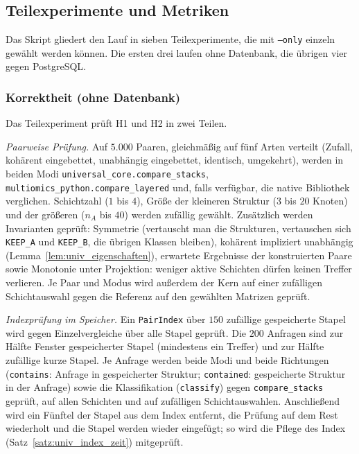 \subsection{Teilexperimente und Metriken}
\label{sec:ucx_teilexperimente}

Das Skript gliedert den Lauf in sieben Teilexperimente, die mit \texttt{--only} einzeln gewählt werden können. Die ersten drei laufen ohne Datenbank, die übrigen vier gegen PostgreSQL.

\subsubsection{Korrektheit (ohne Datenbank)}
\label{sec:ucx_korrektheit}

Das Teilexperiment prüft H1 und H2 in zwei Teilen.

\emph{Paarweise Prüfung.} Auf $5.000$ Paaren, gleichmäßig auf fünf Arten verteilt (Zufall, kohärent eingebettet, unabhängig eingebettet, identisch, umgekehrt), werden in beiden Modi \texttt{universal\_core.compare\_stacks}, \texttt{multiomics\_python.compare\_layered} und, falls verfügbar, die native Bibliothek verglichen. Schichtzahl ($1$ bis $4$), Größe der kleineren Struktur ($3$ bis $20$ Knoten) und der größeren ($n_A$ bis $40$) werden zufällig gewählt. Zusätzlich werden Invarianten geprüft: Symmetrie (vertauscht man die Strukturen, vertauschen sich \texttt{KEEP\_A} und \texttt{KEEP\_B}, die übrigen Klassen bleiben), kohärent impliziert unabhängig (Lemma~\ref{lem:univ_eigenschaften}), erwartete Ergebnisse der konstruierten Paare sowie Monotonie unter Projektion: weniger aktive Schichten dürfen keinen Treffer verlieren. Je Paar und Modus wird außerdem der Kern auf einer zufälligen Schichtauswahl gegen die Referenz auf den gewählten Matrizen geprüft.

\emph{Indexprüfung im Speicher.} Ein \texttt{PairIndex} über $150$ zufällige gespeicherte Stapel wird gegen Einzelvergleiche über alle Stapel geprüft. Die $200$ Anfragen sind zur Hälfte Fenster gespeicherter Stapel (mindestens ein Treffer) und zur Hälfte zufällige kurze Stapel. Je Anfrage werden beide Modi und beide Richtungen (\texttt{contains}: Anfrage in gespeicherter Struktur; \texttt{contained}: gespeicherte Struktur in der Anfrage) sowie die Klassifikation (\texttt{classify}) gegen \texttt{compare\_stacks} geprüft, auf allen Schichten und auf zufälligen Schichtauswahlen. Anschließend wird ein Fünftel der Stapel aus dem Index entfernt, die Prüfung auf dem Rest wiederholt und die Stapel werden wieder eingefügt; so wird die Pflege des Index (Satz~\ref{satz:univ_index_zeit}) mitgeprüft.

